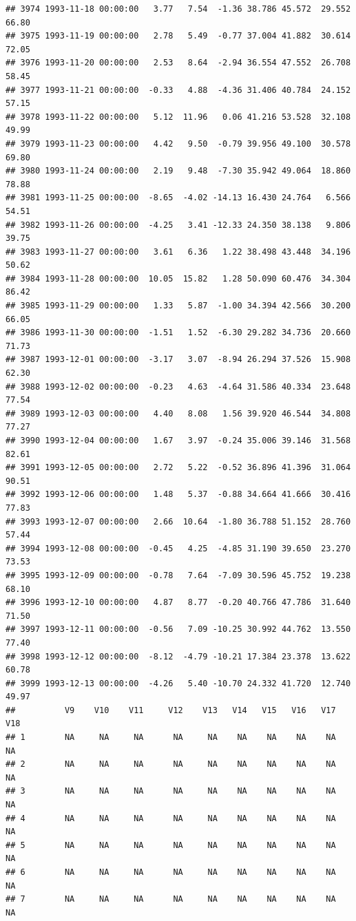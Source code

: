 \documentclass{article}\usepackage{graphicx, color}
\makeatletter
\newenvironment{kframe}{%
 \def\at@end@of@kframe{}%
 \ifinner\ifhmode%
  \def\at@end@of@kframe{\end{minipage}}%
  \begin{minipage}{\columnwidth}%
 \fi\fi%
 \def\FrameCommand##1{\hskip\@totalleftmargin \hskip-\fboxsep
 \colorbox{shadecolor}{##1}\hskip-\fboxsep
     \hskip-\linewidth \hskip-\@totalleftmargin \hskip\columnwidth}%
 \MakeFramed {\advance\hsize-\width
   \@totalleftmargin\z@ \linewidth\hsize
   \@setminipage}}%
 {\par\unskip\endMakeFramed%
 \at@end@of@kframe}
\newenvironment{knitrout}{}{} %
\makeatother
\begin{document}
\begin{knitrout}
\begin{kframe}
\begin{verbatim}
## 3974 1993-11-18 00:00:00   3.77   7.54  -1.36 38.786 45.572  29.552  66.80
## 3975 1993-11-19 00:00:00   2.78   5.49  -0.77 37.004 41.882  30.614  72.05
## 3976 1993-11-20 00:00:00   2.53   8.64  -2.94 36.554 47.552  26.708  58.45
## 3977 1993-11-21 00:00:00  -0.33   4.88  -4.36 31.406 40.784  24.152  57.15
## 3978 1993-11-22 00:00:00   5.12  11.96   0.06 41.216 53.528  32.108  49.99
## 3979 1993-11-23 00:00:00   4.42   9.50  -0.79 39.956 49.100  30.578  69.80
## 3980 1993-11-24 00:00:00   2.19   9.48  -7.30 35.942 49.064  18.860  78.88
## 3981 1993-11-25 00:00:00  -8.65  -4.02 -14.13 16.430 24.764   6.566  54.51
## 3982 1993-11-26 00:00:00  -4.25   3.41 -12.33 24.350 38.138   9.806  39.75
## 3983 1993-11-27 00:00:00   3.61   6.36   1.22 38.498 43.448  34.196  50.62
## 3984 1993-11-28 00:00:00  10.05  15.82   1.28 50.090 60.476  34.304  86.42
## 3985 1993-11-29 00:00:00   1.33   5.87  -1.00 34.394 42.566  30.200  66.05
## 3986 1993-11-30 00:00:00  -1.51   1.52  -6.30 29.282 34.736  20.660  71.73
## 3987 1993-12-01 00:00:00  -3.17   3.07  -8.94 26.294 37.526  15.908  62.30
## 3988 1993-12-02 00:00:00  -0.23   4.63  -4.64 31.586 40.334  23.648  77.54
## 3989 1993-12-03 00:00:00   4.40   8.08   1.56 39.920 46.544  34.808  77.27
## 3990 1993-12-04 00:00:00   1.67   3.97  -0.24 35.006 39.146  31.568  82.61
## 3991 1993-12-05 00:00:00   2.72   5.22  -0.52 36.896 41.396  31.064  90.51
## 3992 1993-12-06 00:00:00   1.48   5.37  -0.88 34.664 41.666  30.416  77.83
## 3993 1993-12-07 00:00:00   2.66  10.64  -1.80 36.788 51.152  28.760  57.44
## 3994 1993-12-08 00:00:00  -0.45   4.25  -4.85 31.190 39.650  23.270  73.53
## 3995 1993-12-09 00:00:00  -0.78   7.64  -7.09 30.596 45.752  19.238  68.10
## 3996 1993-12-10 00:00:00   4.87   8.77  -0.20 40.766 47.786  31.640  71.50
## 3997 1993-12-11 00:00:00  -0.56   7.09 -10.25 30.992 44.762  13.550  77.40
## 3998 1993-12-12 00:00:00  -8.12  -4.79 -10.21 17.384 23.378  13.622  60.78
## 3999 1993-12-13 00:00:00  -4.26   5.40 -10.70 24.332 41.720  12.740  49.97
##          V9    V10    V11     V12    V13   V14   V15   V16   V17    V18
## 1        NA     NA     NA      NA     NA    NA    NA    NA    NA     NA
## 2        NA     NA     NA      NA     NA    NA    NA    NA    NA     NA
## 3        NA     NA     NA      NA     NA    NA    NA    NA    NA     NA
## 4        NA     NA     NA      NA     NA    NA    NA    NA    NA     NA
## 5        NA     NA     NA      NA     NA    NA    NA    NA    NA     NA
## 6        NA     NA     NA      NA     NA    NA    NA    NA    NA     NA
## 7        NA     NA     NA      NA     NA    NA    NA    NA    NA     NA

\end{verbatim}
\end{kframe}
\end{knitrout}
\end{document}
